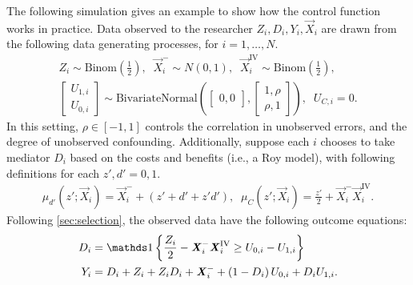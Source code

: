 The following simulation gives an example to show how the control function works in practice.
Data observed to the researcher $Z_i, D_i, Y_i, \vec X_i$ are drawn from the following data generating processes, for $i = 1, \hdots, N$.
\begin{align*}
    Z_i \sim \text{Binom}\left( \frac 12 \right),
    \;\; \vec X_i^- \sim N(0, 1),
    \;\; \vec X_i^{\text{IV}} \sim \text{Binom}\left( \frac 12 \right), \\
    \begin{bmatrix} U_{1,i} \\ U_{0,i} \end{bmatrix} \sim
    \text{BivariateNormal}\left( 
        \begin{bmatrix} 0, 0 \end{bmatrix},
        \begin{bmatrix} 1, \rho \\ \rho, 1 \end{bmatrix} \right),
    \;\; U_{C,i} = 0.
\end{align*}
In this setting, $\rho \in [-1, 1]$ controls the correlation in unobserved errors, and the degree of unobserved confounding.
Additionally, suppose each $i$ chooses to take mediator $D_i$ based on the costs and benefits (i.e., a Roy model), with following definitions for each $z', d' = 0, 1$.
\begin{align*}
    \mu_{d'}\left(z' ; \vec X_i \right) = \vec X_i^- + \left( z' + d' + z' d' \right),
    \;\; \mu_{C}\left(z' ; \vec X_i \right) = \frac{z'}{2} + \vec X_i^- \vec X_i^{\text{IV}}.
\end{align*}
Following \autoref{sec:selection}, the observed data have the following outcome equations:
\begin{align*}
    D_i &= \indicator{\frac{Z_i}{2} - \vec X_i^- \vec X_i^{\text{IV}} \geq U_{0,i} - U_{1,i}}  \\
    Y_i &= D_i + Z_i + Z_i D_i + \vec X_i^-
        + \left( 1 - D_i \right) U_{0,i} + D_i U_{1,i}.
\end{align*}




